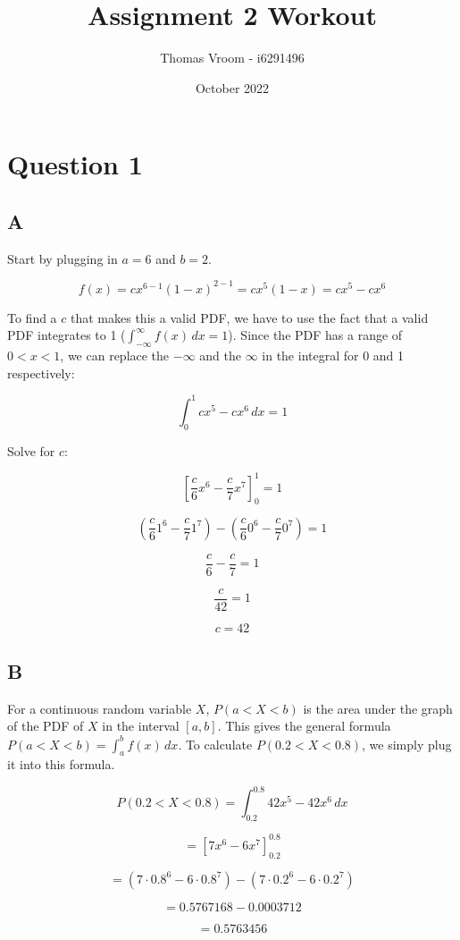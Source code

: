 \documentclass[12pt]{article}
\title{Assignment 2 Workout}
\author{Thomas Vroom - i6291496}
\date{October 2022}
\begin{document}
\maketitle
{}

\section*{Question 1}
\subsection*{A}
Start by plugging in $a = 6$ and $b = 2$.

\[ f(x) = cx^{6-1} (1 - x)^{2-1} = cx^5 (1 - x) = cx^5 - cx^6 \]

\noindent
To find a $c$ that makes this a valid PDF, we have to use the fact that a valid PDF integrates to 1 ($\int_{-\infty}^{\infty} f(x) \,dx = 1 $).
Since the PDF has a range of $0 < x < 1$, we can replace the $-\infty$ and the $\infty$ in the integral for 0 and 1 respectively:

\[ \int_{0}^{1} cx^5 - cx^6 \,dx = 1 \]

\noindent
Solve for $c$:

\[ \left[ \frac{c}{6}x^6 - \frac{c}{7}x^7 \right]_{0}^{1} = 1 \]

\[ (\frac{c}{6}1^6 - \frac{c}{7}1^7) - (\frac{c}{6}0^6 - \frac{c}{7}0^7) = 1 \]

\[ \frac{c}{6} - \frac{c}{7} = 1 \]

\[ \frac{c}{42} = 1 \]

\[ c = 42 \]

\newpage
\subsection*{B}
For a continuous random variable $X$, $P(a < X < b)$ is the area under the graph of the PDF of $X$ in the interval $[a, b]$.
This gives the general formula $P(a < X < b) = \int_{a}^{b} f(x) \,dx $.
To calculate $P(0.2 < X < 0.8)$, we simply plug it into this formula.

\[ P(0.2 < X < 0.8) = \int_{0.2}^{0.8} 42x^5 - 42x^6 \,dx \]

\[ = \left[ 7x^6 - 6x^7 \right]_{0.2}^{0.8} \]

\[ = (7 \cdot 0.8^6 - 6 \cdot 0.8^7) - (7 \cdot 0.2^6 - 6 \cdot 0.2^7) \]

\[ = 0.5767168 - 0.0003712 \]

\[ = 0.5763456 \]
\end{document}
